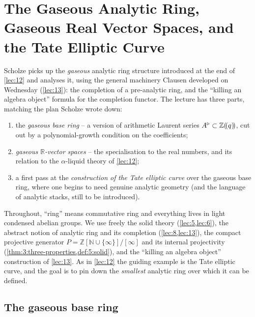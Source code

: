 \section{The Gaseous Analytic Ring, Gaseous Real Vector Spaces, and the Tate Elliptic Curve}
\label{lec:14}

Scholze picks up the \emph{gaseous} analytic ring structure introduced at the end
of \cref{lec:12} and analyses it, using the general machinery Clausen developed on
Wednesday (\cref{lec:13}): the completion of a pre-analytic ring, and the
``killing an algebra object'' formula for the completion functor. The lecture has
three parts, matching the plan Scholze wrote down:
\begin{enumerate}
\item the \emph{gaseous base ring} -- a version of arithmetic Laurent series
$A^{\triangleright}\subset\mathbb{Z}(\!(q)\!)$, cut out by a polynomial-growth condition on the
coefficients;
\item \emph{gaseous $\mathbb{R}$-vector spaces} -- the specialisation to the real
numbers, and its relation to the $\alpha$-liquid theory of \cref{lec:12};
\item a first pass at the \emph{construction of the Tate elliptic curve} over the
gaseous base ring, where one begins to need genuine analytic geometry (and the
language of analytic stacks, still to be introduced).
\end{enumerate}

Throughout, ``ring'' means commutative ring and everything lives in light
condensed abelian groups. We use freely the solid theory
(\cref{lec:5,lec:6}), the abstract notion of analytic ring and its completion
(\cref{lec:8,lec:13}), the compact projective generator
$P=\mathbb{Z}[\mathbb{N}\cup\{\infty\}]/[\infty]$ and its internal projectivity
(\cref{thm:3:three-properties,def:5:solid}), and the ``killing an algebra object''
construction of \cref{lec:13}. As in \cref{lec:12} the guiding example is the Tate
elliptic curve, and the goal is to pin down the \emph{smallest} analytic ring over
which it can be defined.

\subsection{The gaseous base ring}

